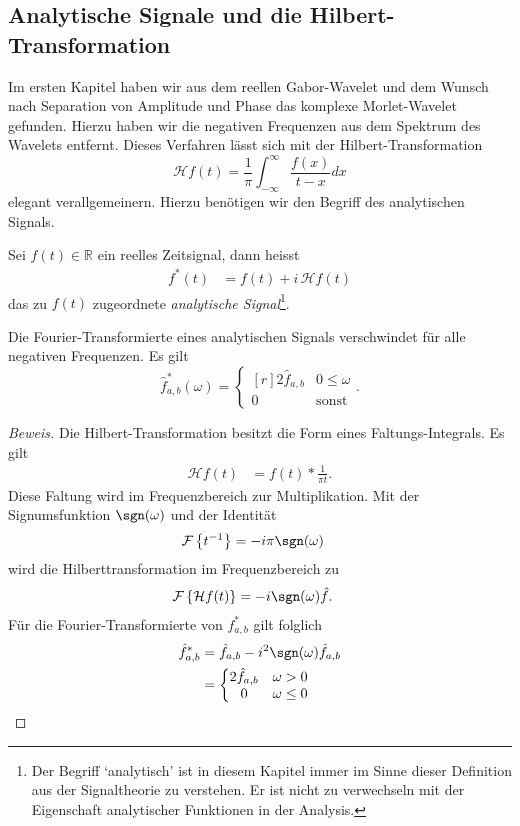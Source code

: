 \subsection{Analytische Signale und die Hilbert-Transformation}
Im ersten Kapitel haben wir aus dem reellen Gabor-Wavelet und dem Wunsch nach Separation von Amplitude und Phase das komplexe Morlet-Wavelet gefunden.
Hierzu haben wir die negativen Frequenzen aus dem Spektrum des Wavelets entfernt.
Dieses Verfahren lässt sich mit der Hilbert-Transformation
\[
	\mathcal{H}f(t) =
	\frac{1}{\pi}\int_{-\infty}^{\infty}\frac{f(x)}{t-x} dx
\]
elegant verallgemeinern.
Hierzu benötigen wir den Begriff des analytischen Signals.
\begin{definition}
	Sei $f(t) \in \mathbb{R}$ ein reelles Zeitsignal, dann heisst
	\begin{align*}
		f^\ast(t) 
		&= f(t) + i\,\mathcal{H}f(t)
	\end{align*}
	das zu $f(t)$ zugeordnete \emph{analytische Signal}\footnote{Der Begriff `analytisch' ist in diesem Kapitel immer im Sinne dieser Definition aus der Signaltheorie zu verstehen.
	Er ist nicht zu verwechseln mit der Eigenschaft analytischer Funktionen in der Analysis.
	}.
\end{definition}

\begin{satz}
	Die Fourier-Transformierte eines analytischen Signals verschwindet für alle negativen Frequenzen.
	Es gilt
	\[
		\hat{f}^\ast_{a,b}(\omega) = \left\lbrace\begin{matrix*}[r]	
			2\hat{f}_{a,b} & 0 \le \omega \\ 0 & \text{sonst}\end{matrix*} \right..
	\]
\end{satz}

\begin{proof}[Beweis]
	Die Hilbert-Transformation besitzt die Form eines Faltungs-Integrals.
	Es gilt
	\begin{align*}
		\mathcal{H} f(t) &= f(t) * \frac{1}{\pi t}.
	\end{align*}
	Diese Faltung wird im Frequenzbereich zur Multiplikation.
	Mit der Signumsfunktion $\sgn(\omega)$ und der Identität
	\begin{align*}
		\mathcal{F} \left\lbrace t^{-1}\right\rbrace  &= -i\pi\sgn(\omega)
	\end{align*}
	wird die Hilberttransformation im Frequenzbereich zu
	\begin{align*}
		\mathcal{F}\left\lbrace \mathcal{H}f(t)\right\rbrace 
		&= -i\sgn(\omega) \hat{f}.
	\end{align*}
	Für die Fourier-Transformierte von $f^\ast_{a,b}$ gilt folglich 
	\begin{align*}
		\hat{f}^\ast_{a,b} 
		&= \hat{f}_{a,b} - i^2\sgn(\omega)\hat{f}_{a,b}\\
		&=\left\lbrace\begin{matrix}
			2\hat{f}_{a,b} & \omega > 0\\
			0 & \omega \le 0
		\end{matrix} \right.\qedhere
	\end{align*}
\end{proof}

